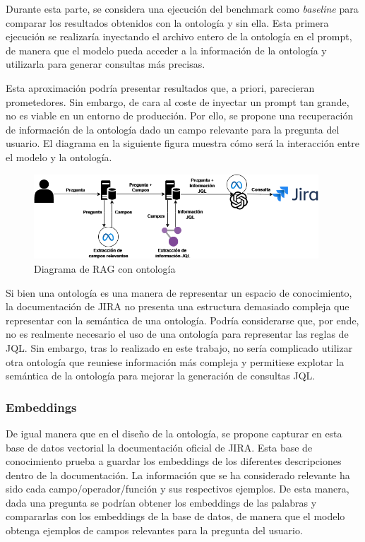 Durante esta parte, se considera una ejecución del benchmark como \textit{baseline} para comparar los resultados obtenidos con la ontología y sin ella. Esta primera ejecución se realizaría inyectando el archivo entero de la ontología en el prompt, de manera que el modelo pueda acceder a la información de la ontología y utilizarla para generar consultas más precisas.

Esta aproximación podría presentar resultados que, a priori, parecieran prometedores. Sin embargo, de cara al coste de inyectar un prompt tan grande, no es viable en un entorno de producción. Por ello, se propone una recuperación de información de la ontología dado un campo relevante para la pregunta del usuario. El diagrama en la siguiente figura muestra cómo será la interacción entre el modelo y la ontología.

\begin{figure}[H]
    \centering
    \includegraphics[width=0.95\textwidth]{images/rag_ontologia.png}
    \caption{Diagrama de RAG con ontología}\label{fig:ontologia}
\end{figure}
Si bien una ontología es una manera de representar un espacio de conocimiento, la documentación de JIRA no presenta una estructura demasiado compleja que representar con la semántica de una ontología. Podría considerarse que, por ende, no es realmente necesario el uso de una ontología para representar las reglas de JQL. Sin embargo, tras lo realizado en este trabajo, no sería complicado utilizar otra ontología que reuniese información más compleja y permitiese explotar la semántica de la ontología para mejorar la generación de consultas JQL.

\subsubsection{Embeddings}
De igual manera que en el diseño de la ontología, se propone capturar en esta base de datos vectorial la documentación oficial de JIRA. Esta base de conocimiento prueba a guardar los embeddings de los diferentes descripciones dentro de la documentación. La información que se ha considerado relevante ha sido cada campo/operador/función y sus respectivos ejemplos. De esta manera, dada una pregunta se podrían obtener los embeddings de las palabras y compararlas con los embeddings de la base de datos, de manera que el modelo obtenga ejemplos de campos relevantes para la pregunta del usuario.

